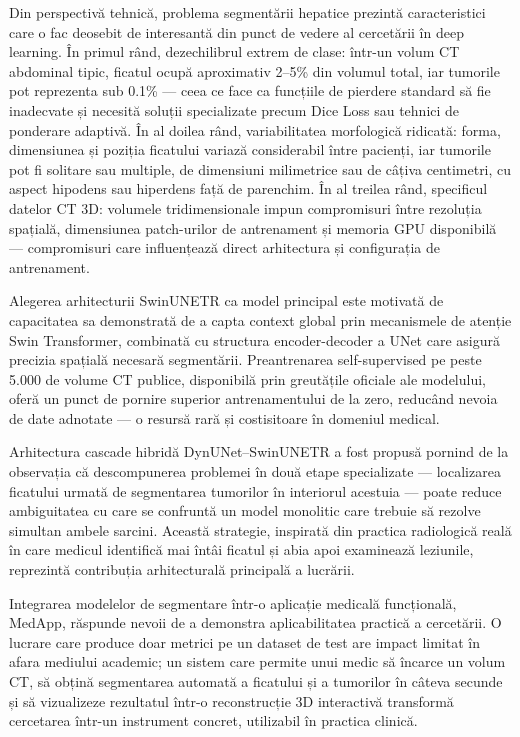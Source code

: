 \documentclass[12pt, a4paper]{report}
\begin{document}
Din perspectivă tehnică, problema segmentării hepatice prezintă
caracteristici care o fac deosebit de interesantă din punct de vedere
al cercetării în deep learning. În primul rând, dezechilibrul
extrem de clase: într-un volum CT abdominal tipic, ficatul ocupă
aproximativ 2--5\% din volumul total, iar tumorile pot reprezenta
sub 0.1\% — ceea ce face ca funcțiile de pierdere standard să fie
inadecvate și necesită soluții specializate precum Dice Loss sau
tehnici de ponderare adaptivă. În al doilea rând, variabilitatea
morfologică ridicată: forma, dimensiunea și poziția ficatului
variază considerabil între pacienți, iar tumorile pot fi solitare
sau multiple, de dimensiuni milimetrice sau de câțiva centimetri,
cu aspect hipodens sau hiperdens față de parenchim. În al treilea
rând, specificul datelor CT 3D: volumele tridimensionale impun
compromisuri între rezoluția spațială, dimensiunea patch-urilor
de antrenament și memoria GPU disponibilă — compromisuri care
influențează direct arhitectura și configurația de antrenament.

Alegerea arhitecturii SwinUNETR ca model principal este motivată
de capacitatea sa demonstrată de a capta context global prin
mecanismele de atenție Swin Transformer, combinată cu structura
encoder-decoder a UNet care asigură precizia spațială necesară
segmentării. Preantrenarea self-supervised pe peste 5.000 de volume
CT publice, disponibilă prin greutățile oficiale ale modelului,
oferă un punct de pornire superior antrenamentului de la zero,
reducând nevoia de date adnotate — o resursă rară și costisitoare
în domeniul medical.

Arhitectura cascade hibridă DynUNet–SwinUNETR a fost propusă
pornind de la observația că descompunerea problemei în două etape
specializate — localizarea ficatului urmată de segmentarea tumorilor
în interiorul acestuia — poate reduce ambiguitatea cu care se
confruntă un model monolitic care trebuie să rezolve simultan
ambele sarcini. Această strategie, inspirată din practica
radiologică reală în care medicul identifică mai întâi ficatul
și abia apoi examinează leziunile, reprezintă contribuția
arhitecturală principală a lucrării.

Integrarea modelelor de segmentare într-o aplicație medicală
funcțională, MedApp, răspunde nevoii de a demonstra aplicabilitatea
practică a cercetării. O lucrare care produce doar metrici pe un
dataset de test are impact limitat în afara mediului academic;
un sistem care permite unui medic să încarce un volum CT, să obțină
segmentarea automată a ficatului și a tumorilor în câteva secunde
și să vizualizeze rezultatul într-o reconstrucție 3D interactivă
transformă cercetarea într-un instrument concret, utilizabil în
practica clinică.
\end{document}
